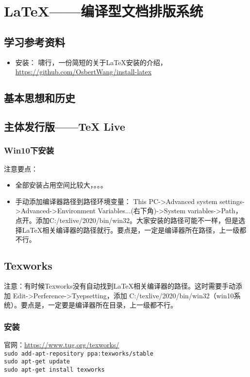 \chapter{\LaTeX{}——编译型文档排版系统}
\section{学习参考资料}
\begin{itemize}
\item 安装： 啸行，一份简短的关于\LaTeX{}安装的介绍，\url{https://github.com/OsbertWang/install-latex}
\end{itemize}


\section{基本思想和历史}



\section{主体发行版——\TeX{} Live }
\subsection{Win10下安装}
注意要点：
\begin{itemize}
\item 全部安装占用空间比较大，。。。
\item 手动添加编译器路径到路径环境变量：
This PC->Advanced system settings->Advanced->Environment Variables...(右下角)->System variables->Path，点开。添加C:/texlive/2020/bin/win32。大家安装的路径可能不一样，但是选择\LaTeX{}相关编译器的路径就行。要点是，一定是编译器所在路径，上一级都不行。
\end{itemize}




\section{Texworks}
注意：有时候Texworks没有自动找到\LaTeX{}相关编译器的路径。这时需要手动添加
Edit->Perference->Tyepsetting，添加
C:/texlive/2020/bin/win32（win10系统）。要点是，一定要是编译器所在目录，上一级都不行。


\subsection{安装}
官网：\url{https://www.tug.org/texworks/}\\
\verb|sudo add-apt-repository ppa:texworks/stable|\\
\verb|sudo apt-get update|\\
\verb|sudo apt-get install texworks|


